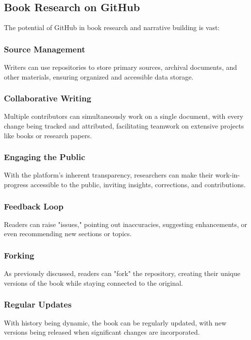 \documentclass{book}
\begin{document}
\subsection*{Book Research on GitHub}
The potential of GitHub in book research and narrative building is vast:

\subsubsection*{Source Management}
Writers can use repositories to store primary sources, archival documents, and other materials, ensuring organized and accessible data storage.

\subsubsection*{Collaborative Writing}
Multiple contributors can simultaneously work on a single document, with every change being tracked and attributed, facilitating teamwork on extensive projects like books or research papers.

\subsubsection*{Engaging the Public}
With the platform's inherent transparency, researchers can make their work-in-progress accessible to the public, inviting insights, corrections, and contributions.

\subsubsection*{Feedback Loop}
Readers can raise "issues," pointing out inaccuracies, suggesting enhancements, or even recommending new sections or topics.

\subsubsection*{Forking}
As previously discussed, readers can "fork" the repository, creating their unique versions of the book while staying connected to the original.

\subsubsection*{Regular Updates}
With history being dynamic, the book can be regularly updated, with new versions being released when significant changes are incorporated.
\end{document}
